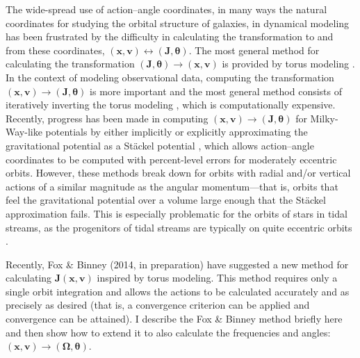 \documentclass[12pt,preprint]{aastex}
\newcommand{\eg}{e.g.}
\renewcommand{\vec}[1]{\ensuremath{\mathbf{#1}}}
\newcommand{\vecx}{\ensuremath{\vec{x}}}
\newcommand{\vecv}{\ensuremath{\vec{v}}}
\newcommand{\vecj}{\ensuremath{\vec{J}}}
\newcommand{\veco}{\ensuremath{\vec{\Omega}}}
\newcommand{\veca}{\ensuremath{\boldsymbol\theta}}
\begin{document}
The wide-spread use of action--angle coordinates, in many ways the
natural coordinates for studying the orbital structure of galaxies, in
dynamical modeling has been frustrated by the difficulty in
calculating the transformation to and from these coordinates,
$(\vecx,\vecv) \leftrightarrow (\vecj,\veca)$. The most general method
for calculating the transformation $(\vecj,\veca) \rightarrow
(\vecx,\vecv)$ is provided by torus modeling \citep{McGill90a}. In the
context of modeling observational data, computing the transformation
$(\vecx,\vecv) \rightarrow (\vecj,\veca)$ is more important and the
most general method consists of iteratively inverting the torus
modeling \citep{McMillan08a}, which is computationally
expensive. Recently, progress has been made in computing
$(\vecx,\vecv) \rightarrow (\vecj,\veca)$ for Milky-Way-like
potentials by either implicitly or explicitly approximating the
gravitational potential as a St\"{a}ckel potential
\citep{Binney12a,Sanders12a}, which allows action--angle coordinates
to be computed with percent-level errors for moderately eccentric
orbits. However, these methods break down for orbits with radial
and/or vertical actions of a similar magnitude as the angular
momentum---that is, orbits that feel the gravitational potential over
a volume large enough that the St\"{a}ckel approximation fails. This
is especially problematic for the orbits of stars in tidal streams, as
the progenitors of tidal streams are typically on quite eccentric
orbits \citep[\eg,][]{Sanders13a}.

Recently, Fox \& Binney (2014, in preparation) have suggested a new
method for calculating $\vecj(\vecx,\vecv)$ inspired by torus
modeling. This method requires only a single orbit integration and
allows the actions to be calculated accurately and as precisely as
desired (that is, a convergence criterion can be applied and
convergence can be attained). I describe the Fox \& Binney method
briefly here and then show how to extend it to also calculate the
frequencies and angles: $(\vecx,\vecv) \rightarrow (\veco,\veca)$.
\end{document}
